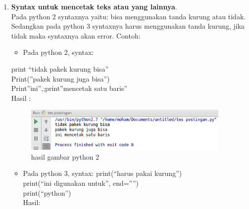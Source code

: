 \begin{enumerate}
\item \textbf{Syntax untuk mencetak teks atau yang lainnya}.\\
Pada python 2 syntaxnya yaitu: bisa menggunakan tanda kurung atau tidak. Sedangkan pada python 3 syntaxnya harus menggunakan tanda kurung, jika tidak maka syntaxnya akan error. Contoh:\\
\begin{itemize}
\item Pada python 2, syntax:
\end{itemize}
        print “tidak pakek kurung bisa”\\
        Print(”pakek kurung juga bisa”)\\
        Print”ini”,;print”mencetak satu baris”\\
        Hasil :    \\

	\begin{figure}[h]
	\centering
	\includegraphics[width=10cm]{gambar/satu.png}
	\caption{hasil gambar python 2}
	\label{fig:gambar}
	\end{figure}
	\begin{itemize}
	\item Pada python 3, syntax:
		print(“harus pakai kurung”)\\
		print(“ini digunakan untuk”, end=””)\\
		print(“python”)\\
		Hasil:\\
		

\end{itemize}
\end{enumerate}
